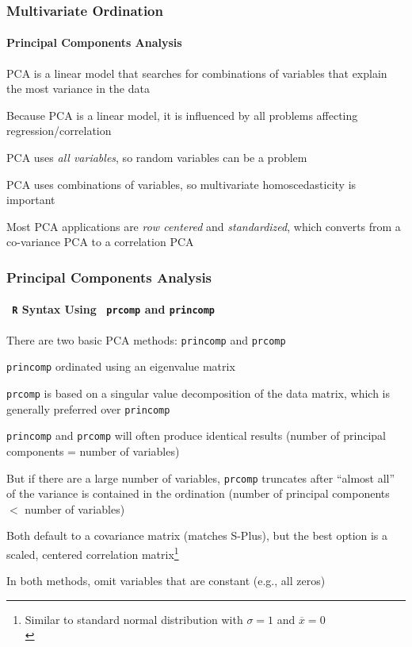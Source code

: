 \documentclass[10pt]{beamer}
\begin{document}
\begin{frame}
\frametitle{Multivariate Ordination}
\framesubtitle{Principal Components Analysis}

\bi
\item PCA is a linear model that searches for combinations of
variables that explain the most variance in the data

\item Because PCA is a linear model, it is influenced by
all problems affecting regression/correlation

\item PCA uses {\em all variables}, so random variables can be
  a problem

\item PCA uses combinations of variables, so multivariate
  homoscedasticity is important

\bi
\item Most PCA applications are {\em row centered} and {\em
  standardized}, which converts from a co-variance PCA to a correlation PCA
\ei

\ei
\end{frame}



\begin{frame}[fragile]
\frametitle{Principal Components Analysis} 
\framesubtitle{{\tt \color{red} R} Syntax Using {\color{red} \tt
    prcomp} and {\color{red} \tt princomp}}

\bi
\item There are two basic PCA methods: {\color{red} \tt princomp} and
  {\color{red} \tt prcomp}

   \bi
   \item {\color{red} \tt princomp} ordinated using an eigenvalue matrix
   \item {\color{red} \tt prcomp} is based on a singular value
   decomposition of the data matrix, which is generally preferred over
   {\color{red} \tt princomp}
   \item {\color{red} \tt princomp} and {\color{red} \tt prcomp} will
     often produce identical results (number of principal components = number of variables)
   \item But if there are a large number of variables, {\color{red}
     \tt prcomp} truncates after ``almost all'' of the variance is
     contained in the ordination (number of principal components $<$
     number of variables) \ei

\item Both default to a covariance matrix (matches S-Plus), but the
  best option is a scaled, centered correlation matrix\footnote{\tiny
    Similar to standard normal distribution with $\sigma=1$ and
    $\overline{x}=0$\\}

\item In both methods, omit variables that are constant (e.g.,
  all zeros)

\ei
\end{frame}
\end{document}
